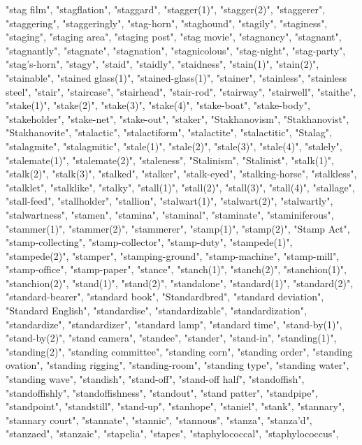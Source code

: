"stag film",
"stagflation",
"staggard",
"stagger(1)",
"stagger(2)",
"staggerer",
"staggering",
"staggeringly",
"stag-horn",
"staghound",
"stagily",
"staginess",
"staging",
"staging area",
"staging post",
"stag movie",
"stagnancy",
"stagnant",
"stagnantly",
"stagnate",
"stagnation",
"stagnicolous",
"stag-night",
"stag-party",
"stag's-horn",
"stagy",
"staid",
"staidly",
"staidness",
"stain(1)",
"stain(2)",
"stainable",
"stained glass(1)",
"stained-glass(1)",
"stainer",
"stainless",
"stainless steel",
"stair",
"staircase",
"stairhead",
"stair-rod",
"stairway",
"stairwell",
"staithe",
"stake(1)",
"stake(2)",
"stake(3)",
"stake(4)",
"stake-boat",
"stake-body",
"stakeholder",
"stake-net",
"stake-out",
"staker",
"Stakhanovism",
"Stakhanovist",
"Stakhanovite",
"stalactic",
"stalactiform",
"stalactite",
"stalactitic",
"Stalag",
"stalagmite",
"stalagmitic",
"stale(1)",
"stale(2)",
"stale(3)",
"stale(4)",
"stalely",
"stalemate(1)",
"stalemate(2)",
"staleness",
"Stalinism",
"Stalinist",
"stalk(1)",
"stalk(2)",
"stalk(3)",
"stalked",
"stalker",
"stalk-eyed",
"stalking-horse",
"stalkless",
"stalklet",
"stalklike",
"stalky",
"stall(1)",
"stall(2)",
"stall(3)",
"stall(4)",
"stallage",
"stall-feed",
"stallholder",
"stallion",
"stalwart(1)",
"stalwart(2)",
"stalwartly",
"stalwartness",
"stamen",
"stamina",
"staminal",
"staminate",
"staminiferous",
"stammer(1)",
"stammer(2)",
"stammerer",
"stamp(1)",
"stamp(2)",
"Stamp Act",
"stamp-collecting",
"stamp-collector",
"stamp-duty",
"stampede(1)",
"stampede(2)",
"stamper",
"stamping-ground",
"stamp-machine",
"stamp-mill",
"stamp-office",
"stamp-paper",
"stance",
"stanch(1)",
"stanch(2)",
"stanchion(1)",
"stanchion(2)",
"stand(1)",
"stand(2)",
"standalone",
"standard(1)",
"standard(2)",
"standard-bearer",
"standard book",
"Standardbred",
"standard deviation",
"Standard English",
"standardise",
"standardizable",
"standardization",
"standardize",
"standardizer",
"standard lamp",
"standard time",
"stand-by(1)",
"stand-by(2)",
"stand camera",
"standee",
"stander",
"stand-in",
"standing(1)",
"standing(2)",
"standing committee",
"standing corn",
"standing order",
"standing ovation",
"standing rigging",
"standing-room",
"standing type",
"standing water",
"standing wave",
"standish",
"stand-off",
"stand-off half",
"standoffish",
"standoffishly",
"standoffishness",
"standout",
"stand patter",
"standpipe",
"standpoint",
"standstill",
"stand-up",
"stanhope",
"staniel",
"stank",
"stannary",
"stannary court",
"stannate",
"stannic",
"stannous",
"stanza",
"stanza'd",
"stanzaed",
"stanzaic",
"stapelia",
"stapes",
"staphylococcal",
"staphylococcus",
